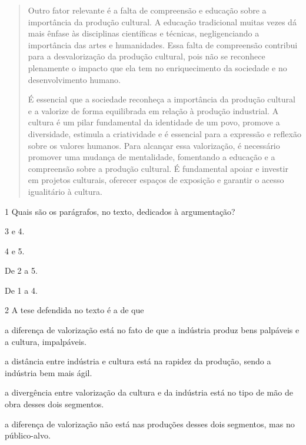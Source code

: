 \begin{quote}
Outro fator relevante é a falta de compreensão e educação sobre a
importância da produção cultural. A educação tradicional muitas vezes dá
mais ênfase às disciplinas científicas e técnicas, negligenciando a
importância das artes e humanidades. Essa falta de compreensão contribui
para a desvalorização da produção cultural, pois não se reconhece
plenamente o impacto que ela tem no enriquecimento da sociedade e no
desenvolvimento humano.

É essencial que a sociedade reconheça a importância da produção cultural
e a valorize de forma equilibrada em relação à produção industrial. A
cultura é um pilar fundamental da identidade de um povo, promove a
diversidade, estimula a criatividade e é essencial para a expressão e
reflexão sobre os valores humanos. Para alcançar essa valorização, é
necessário promover uma mudança de mentalidade, fomentando a educação e
a compreensão sobre a produção cultural. É fundamental apoiar e investir
em projetos culturais, oferecer espaços de exposição e garantir o acesso
igualitário à cultura.
\end{quote}

\num{1} Quais são os parágrafos, no texto, dedicados à argumentação?

\begin{multicols}{2}
\begin{escolha}
\item
  3 e 4.
\item
  4 e 5.
\item
  De 2 a 5.
\item
  De 1 a 4.
\end{escolha}
\end{multicols}

\pagebreak
\num{2} A tese defendida no texto é a de que

\begin{escolha}
\item
  a diferença de valorização está no fato de que a indústria produz bens
  palpáveis e a cultura, impalpáveis.
\item
  a distância entre indústria e cultura está na rapidez da produção,
  sendo a indústria bem mais ágil.
\item
  a divergência entre valorização da cultura e da indústria está no tipo
  de mão de obra desses dois segmentos.
\item
  a diferença de valorização não está nas produções desses dois
  segmentos, mas no público-alvo.
\end{escolha}

